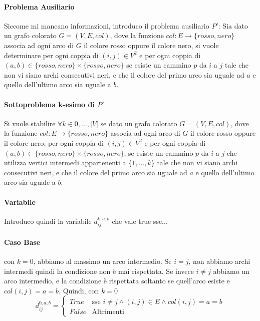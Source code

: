 \documentclass[12pt, a4paper, openany]{book}
\begin{document}
\paragraph*{Problema Ausiliario}
Siccome mi mancano informazioni, introduco il problema ausiliario $P'$:
Sia dato un grafo colorato $G=(V,E,col)$, dove la funzione $col:E\to \{rosso,nero\}$ associa ad ogni arco di $G$ il colore rosso oppure il colore nero,
si vuole determinare per ogni coppia di $(i,j) \in V^2$ e per ogni coppia di $(a,b)\in \{rosso,nero\}\times \{rosso,nero\}$ se esiste un cammino $p$ da $i$ a $j$ tale che
non vi siano archi consecutivi neri, e che il colore del primo arco sia uguale ad $a$ e quello dell'ultimo arco sia uguale a $b$.

\paragraph*{Sottoproblema k-esimo di $P'$}
Si vuole stabilire $\forall k \in {0,...,|V|}$ se dato un grafo colorato $G=(V,E,col)$, dove la funzione $col:E\to \{rosso,nero\}$ associa ad ogni arco di $G$ il colore rosso oppure il colore nero,
per ogni coppia di $(i,j) \in V^2$ e per ogni coppia di $(a,b)\in \{rosso,nero\}\times \{rosso,nero\}$,  se esiste un cammino $p$ da $i$ a $j$ che utilizza vertici intermedi appartenenti a $\{1,...,k\}$ tale che
non vi siano archi consecutivi neri, e che il colore del primo arco sia uguale ad $a$ e quello dell'ultimo arco sia uguale a $b$.

\paragraph*{Variabile}
Introduco quindi la variabile $d_{ij}^{k,a,b}$ che vale true sse...

\paragraph*{Caso Base} con $k=0$, abbiamo al massimo un arco intermedio.
Se $i=j$, non abbiamo archi intermedi quindi la condizione non è mai rispettata.
Se invece $i\neq j$ abbiamo un arco intermedio, e la condizione è rispettata soltanto se quell'arco esiste e $col(i,j)=a=b$.
Quindi, con $k=0$
$$
	d_{ij}^{0,a,b}= \begin{cases}
		True  & \text{sse } i\neq j \wedge (i,j) \in E \wedge col(i,j) = a = b \\
		False & \text{Altrimenti}
	\end{cases}
$$
\end{document}
